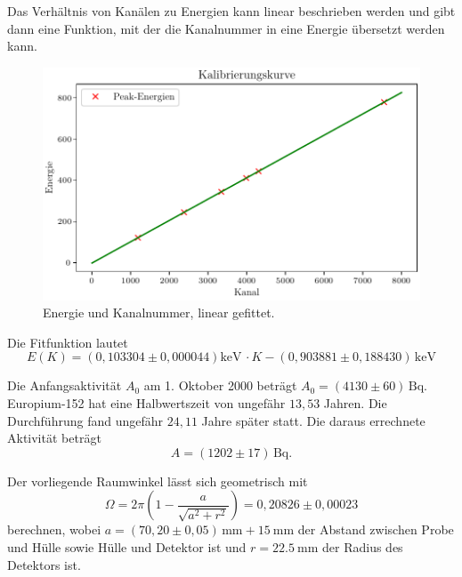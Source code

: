Das Verhältnis von Kanälen zu Energien kann linear beschrieben werden und gibt dann eine Funktion, mit der die Kanalnummer in eine Energie übersetzt werden kann.

\begin{figure}[H]
    \centering
    \includegraphics[width=\textwidth]{plots/EuKalibrierung.pdf}
    \caption{Energie und Kanalnummer, linear gefittet.}
    \label{fig:kalibrierung}
\end{figure}

Die Fitfunktion lautet
\begin{equation}
    E(K) = (0,103304 \pm 0,000044) \si{\kilo\electronvolt} \, \cdot K - (0,903881 \pm 0,188430) \, \si{\kilo\electronvolt}
    \label{eq:kanalenergie}
\end{equation}

Die Anfangsaktivität $A_0$ am 1. Oktober 2000 beträgt $A_0 = (4130 \pm 60) \, \si{\becquerel}$. Europium-152 hat eine Halbwertszeit von ungefähr $13,53$ Jahren.
Die Durchführung fand ungefähr $24,11$ Jahre später statt.
Die daraus errechnete Aktivität beträgt
\begin{equation}
    A = (1202 \pm 17) \, \si{\becquerel}.
    \label{eq:aktivitätEu}
\end{equation}

Der vorliegende Raumwinkel lässt sich geometrisch mit
\begin{equation}
    \Omega = 2 \pi (1 - \frac{a}{\sqrt{a^2 + r^2}}) = 0,20826 \pm 0,00023
\end{equation}
berechnen, wobei $a = (70,20 \pm 0,05) \, \si{\milli\meter} + \SI{15}{\milli\meter}$ der Abstand zwischen Probe und Hülle sowie Hülle und Detektor ist und $r = \SI{22,5}{\milli\meter}$ der Radius des Detektors ist.
 
